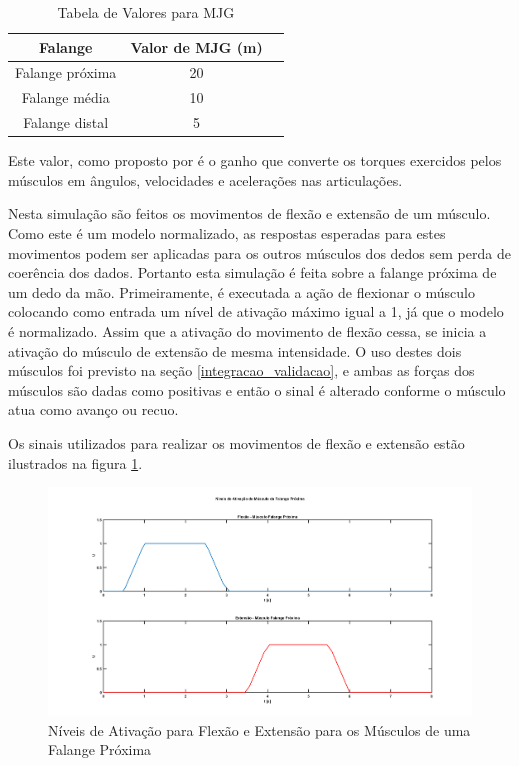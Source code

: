 \begin{table}[H]
\centering
\caption{Tabela de Valores para MJG}
\label{MJG_tabela}
\begin{tabular}{|c|c|c|}
	\hline
    Falange & Valor de MJG (m) \\ \hline
    Falange próxima & 20 \\ \hline
    Falange média & 10 \\ \hline
    Falange distal & 5 \\
	\hline
\end{tabular}
\end{table}

Este valor, como proposto por \cite{feng1999surface} é o ganho que converte os torques exercidos pelos músculos em ângulos, velocidades e acelerações nas articulações.

Nesta simulação são feitos os movimentos de flexão e extensão de um músculo. Como este é um modelo normalizado, as respostas esperadas para estes movimentos podem ser aplicadas para os outros músculos dos dedos sem perda de coerência dos dados. Portanto esta simulação é feita sobre a falange próxima de um dedo da mão. Primeiramente, é executada a ação de flexionar o músculo colocando como entrada um nível de ativação máximo igual a 1, já que o modelo é normalizado. Assim que a ativação do movimento de flexão cessa, se inicia a ativação do músculo de extensão de mesma intensidade. O uso destes dois músculos foi previsto na seção \ref{integracao_validacao}, e ambas as forças dos músculos são dadas como positivas e então o sinal é alterado conforme o músculo atua como avanço ou recuo.

Os sinais utilizados para realizar os movimentos de flexão e extensão estão ilustrados na figura \ref{ativacao_musculos}.

\begin{figure}[H]
\centering
\includegraphics[width = 1\textwidth]{img/niveis_ativacao.png}
\caption[Níveis de Ativação para Flexão e Extensão para os Músculos de uma Falange Próxima]{Níveis de Ativação para Flexão e Extensão para os Músculos de uma Falange Próxima}
\label{ativacao_musculos}
\end{figure}

